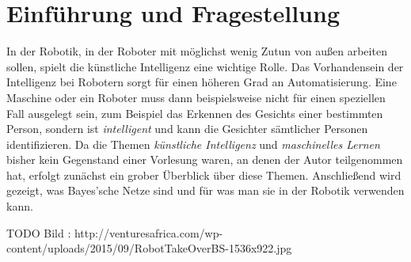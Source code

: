 \chapter{Einführung und Fragestellung}
In der Robotik, in der Roboter mit möglichst wenig Zutun von außen arbeiten sollen, spielt die künstliche Intelligenz eine wichtige Rolle. Das Vorhandensein der Intelligenz bei Robotern sorgt für einen höheren Grad an Automatisierung. Eine Maschine oder ein Roboter muss dann beispielsweise nicht für einen speziellen Fall ausgelegt sein, zum Beispiel das Erkennen des Gesichts einer bestimmten Person, sondern ist \textit{intelligent} und kann die Gesichter sämtlicher Personen identifizieren. 
Da die Themen \textit{künstliche Intelligenz} und \textit{maschinelles Lernen} bisher kein Gegenstand einer Vorlesung waren, an denen der Autor teilgenommen hat, erfolgt zunächst ein grober Überblick über diese Themen.
Anschließend wird gezeigt, was Bayes'sche Netze sind und für was man sie in der Robotik verwenden kann. 

TODO Bild : http://venturesafrica.com/wp-content/uploads/2015/09/RobotTakeOverBS-1536x922.jpg
